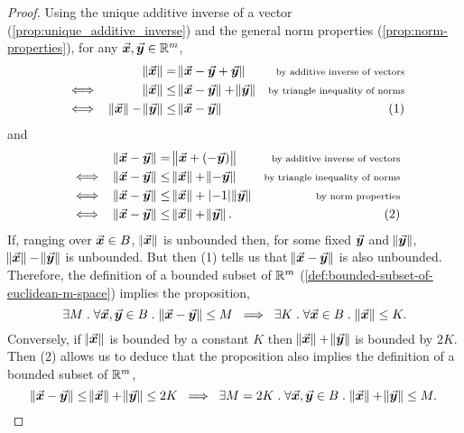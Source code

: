 \documentclass[../MathsNotesBase.tex]{subfiles}
\begin{document}
		\biggerskip
		\begin{proof}
			Using the unique additive inverse of a vector (\autoref{prop:unique_additive_inverse}) and the general norm properties (\autoref{prop:norm-properties}), for any ${ \vec{\bm{x}},\vec{\bm{y}} \in \mathbb{R}^{m} }$,
			\[\begin{aligned}
				&& \norm{\vec{\bm{x}}} &= \norm{\vec{\bm{x}} - \vec{\bm{y}} + \vec{\bm{y}}} &\text{\scriptsize{by additive inverse of vectors}}\\
				&\iff & \norm{\vec{\bm{x}}} &\leq \norm{\vec{\bm{x}} - \vec{\bm{y}}} + \norm{\vec{\bm{y}}} &\text{\scriptsize{by triangle inequality of norms}} \\
				&\iff & \norm{\vec{\bm{x}}} - \norm{\vec{\bm{y}}} &\leq \norm{\vec{\bm{x}} - \vec{\bm{y}}}  &(1)
			\end{aligned}\]
			and
			\[\begin{aligned}
				&& \norm{\vec{\bm{x}} - \vec{\bm{y}}} &= \norm{\vec{\bm{x}} + (-\vec{\bm{y}})} &\text{\scriptsize{by additive inverse of vectors}}\\
				&\iff & \norm{\vec{\bm{x}} - \vec{\bm{y}}} &\leq \norm{\vec{\bm{x}}} + \norm{-\vec{\bm{y}}} &\text{\scriptsize{by triangle inequality of norms}} \\
				&\iff & \norm{\vec{\bm{x}} - \vec{\bm{y}}} &\leq \norm{\vec{\bm{x}}} + \left\lvert-1\right\rvert\norm{\vec{\bm{y}}} &\text{\scriptsize{by norm properties}} \\
				&\iff & \norm{\vec{\bm{x}} - \vec{\bm{y}}} &\leq \norm{\vec{\bm{x}}} + \norm{\vec{\bm{y}}}.  &(2)
			\end{aligned}\]
			\nl
			If, ranging over ${ \vec{\bm{x}} \in B }$, $\norm{\vec{\bm{x}}}$ is unbounded then, for some fixed $\vec{\bm{y}}$ and $\norm{\vec{\bm{y}}}$, ${ \norm{\vec{\bm{x}}} - \norm{\vec{\bm{y}}} }$ is unbounded. But then (1) tells us that ${ \norm{\vec{\bm{x}} - \vec{\bm{y}}} }$ is also unbounded. Therefore, the definition of a bounded subset of $\mathbb{R}^{m}$ (\ref{def:bounded-subset-of-euclidean-m-space}) implies the proposition,
			\[ \exists M \;.\; \forall \vec{\bm{x}},\vec{\bm{y}} \in B \;.\; \norm{\vec{\bm{x}} - \vec{\bm{y}}} \leq M \; \implies \; \exists K \;.\; \forall \vec{\bm{x}} \in B \;.\; \norm{\vec{\bm{x}}} \leq K. \]
			Conversely, if $\norm{\vec{\bm{x}}}$ is bounded by a constant $K$ then ${ \norm{\vec{\bm{x}}} + \norm{\vec{\bm{y}}} }$ is bounded by $2K$. Then (2) allows us to deduce that the proposition also implies the definition of a bounded subset of $\mathbb{R}^{m}$,
			\[ \norm{\vec{\bm{x}} - \vec{\bm{y}}} \leq \norm{\vec{\bm{x}}} + \norm{\vec{\bm{y}}} \leq 2K \; \implies \; \exists M = 2K \;.\; \forall \vec{\bm{x}},\vec{\bm{y}} \in B \;.\; \norm{\vec{\bm{x}}} + \norm{\vec{\bm{y}}} \leq M. \]
		\end{proof}
	
	
	
		\biggerskip
		\nl[6]
	
\end{document}
